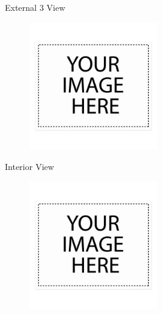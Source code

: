 \documentclass[10pt]{beamer}
\begin{document}
\begin{frame}{External 3 View}
\begin{figure}
	\centering
	\includegraphics[width=0.5\textwidth]{External_3_View.png}
\end{figure}
\end{frame}

	\begin{frame}{Interior View}
\begin{figure}
	\centering
	\includegraphics[width=0.5\textwidth]{Interior_View.png}
\end{figure}
\end{frame}
\end{document}
